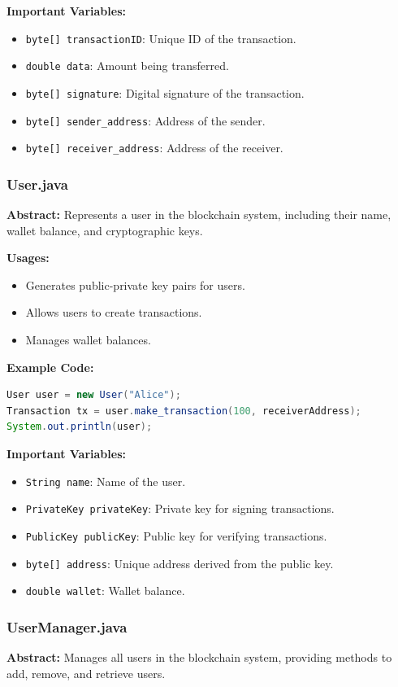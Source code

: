 \documentclass[12pt]{article}
\begin{document}
\textbf{Important Variables:}
\begin{itemize}
    \item \texttt{byte[] transactionID}: Unique ID of the transaction.
    \item \texttt{double data}: Amount being transferred.
    \item \texttt{byte[] signature}: Digital signature of the transaction.
    \item \texttt{byte[] sender\_address}: Address of the sender.
    \item \texttt{byte[] receiver\_address}: Address of the receiver.
\end{itemize}

\subsubsection{User.java}
\textbf{Abstract:} Represents a user in the blockchain system, including their name, wallet balance, and cryptographic keys.

\textbf{Usages:}
\begin{itemize}
    \item Generates public-private key pairs for users.
    \item Allows users to create transactions.
    \item Manages wallet balances.
\end{itemize}

\textbf{Example Code:}
\begin{lstlisting}[language=Java]
User user = new User("Alice");
Transaction tx = user.make_transaction(100, receiverAddress);
System.out.println(user);
\end{lstlisting}

\textbf{Important Variables:}
\begin{itemize}
    \item \texttt{String name}: Name of the user.
    \item \texttt{PrivateKey privateKey}: Private key for signing transactions.
    \item \texttt{PublicKey publicKey}: Public key for verifying transactions.
    \item \texttt{byte[] address}: Unique address derived from the public key.
    \item \texttt{double wallet}: Wallet balance.
\end{itemize}

\subsubsection{UserManager.java}
\textbf{Abstract:} Manages all users in the blockchain system, providing methods to add, remove, and retrieve users.
\end{document}

